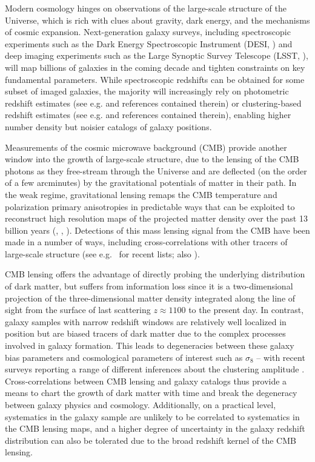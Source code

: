 \documentclass[a4paper,usenatbib]{mnras}
\begin{document}
Modern cosmology hinges on observations of the large-scale structure of the Universe, which is rich with clues about gravity, dark energy, and the mechanisms of cosmic expansion. Next-generation galaxy surveys, including spectroscopic experiments such as the Dark Energy Spectroscopic Instrument (DESI, \citealt{DESI16}) and deep imaging experiments such as the Large Synoptic Survey Telescope (LSST, \citealt{LSST09}), will map billions of galaxies in the coming decade and tighten constraints on key fundamental parameters. While spectroscopic redshifts can be obtained for some subset of imaged galaxies, the majority will increasingly rely on photometric redshift estimates (see e.g. \citealt{Hogg98} and references contained therein) or clustering-based redshift estimates (see e.g. \citealt{Newman08} and references contained therein), enabling higher number density but noisier catalogs of galaxy positions.

Measurements of the cosmic microwave background (CMB) provide another window into the growth of large-scale structure, due to the lensing of the CMB photons as they free-stream through the Universe and are deflected (on the order of a few arcminutes) by the gravitational potentials of matter in their path. In the weak regime, gravitational lensing remaps the CMB temperature and polarization primary anisotropies in predictable ways that can be exploited to reconstruct high resolution maps of the projected matter density over the past 13 billion years (\citealt{ZaldarriagaSeljak99}, \citealt{HuOkamoto02}, \citealt{LewisChallinor06}). Detections of this mass lensing signal from the CMB have been made in a number of ways, including cross-correlations with other tracers of large-scale structure (see e.g.\ \citealt{PlanckI,Omori++19} for recent lists; also \citealt{Krolewski19}).

CMB lensing offers the advantage of directly probing the underlying distribution of dark matter, but suffers from information loss since it is a two-dimensional projection of the three-dimensional matter density integrated along the line of sight from the surface of last scattering $z \approx 1100$ to the present day. In contrast, galaxy samples with narrow redshift windows are relatively well localized in position but are biased tracers of dark matter due to the complex processes involved in galaxy formation. This leads to degeneracies between these galaxy bias parameters and cosmological parameters of interest such as $\sigma_8$ -- with recent surveys reporting a range of different inferences about the clustering amplitude \citep[e.g.][and references therein]{PlanckVI,Troxel18,Hikage19,Troster20,Philcox20,eBOSS20}. Cross-correlations between CMB lensing and galaxy catalogs thus provide a means to chart the growth of dark matter with time and break the degeneracy between galaxy physics and cosmology. Additionally, on a practical level, systematics in the galaxy sample are unlikely to be correlated to systematics in the CMB lensing maps, and a higher degree of uncertainty in the galaxy redshift distribution can also be tolerated due to the broad redshift kernel of the CMB lensing.
\end{document}
